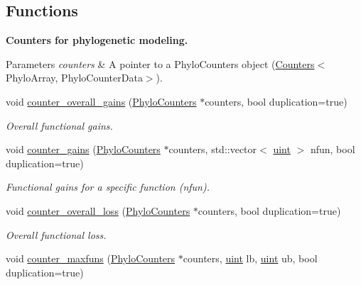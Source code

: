 \subsection*{Functions}
\begin{Indent}\textbf{ Counters for phylogenetic modeling.}\par
{\em 
\begin{DoxyParams}{Parameters}
{\em counters} & A pointer to a {\ttfamily Phylo\+Counters} object ({\ttfamily \hyperlink{classbarry_1_1_counters}{Counters}}$<${\ttfamily Phylo\+Array}, {\ttfamily Phylo\+Counter\+Data}$>$). \\
\hline
\end{DoxyParams}
}\begin{DoxyCompactItemize}
\item 
void \hyperlink{namespacebarry_1_1counters_1_1phylo_ae1e599324d656660ce8730b77efcbcce}{counter\+\_\+overall\+\_\+gains} (\hyperlink{namespacebarry_1_1counters_1_1phylo_a4e401ffe66d04091343dcffaf915f8c3}{Phylo\+Counters} $\ast$counters, bool duplication=true)
\begin{DoxyCompactList}\small\item\em Overall functional gains. \end{DoxyCompactList}\item 
void \hyperlink{namespacebarry_1_1counters_1_1phylo_afc1215e596c2f5a5e3b6f39273427a9a}{counter\+\_\+gains} (\hyperlink{namespacebarry_1_1counters_1_1phylo_a4e401ffe66d04091343dcffaf915f8c3}{Phylo\+Counters} $\ast$counters, std\+::vector$<$ \hyperlink{namespacebarry_a11dfc53ddb4672278319aa04f1e09a6c}{uint} $>$ nfun, bool duplication=true)
\begin{DoxyCompactList}\small\item\em Functional gains for a specific function ({\ttfamily nfun}). \end{DoxyCompactList}\item 
void \hyperlink{namespacebarry_1_1counters_1_1phylo_a79ccde09af0d3d47b1a3162a16bc4597}{counter\+\_\+overall\+\_\+loss} (\hyperlink{namespacebarry_1_1counters_1_1phylo_a4e401ffe66d04091343dcffaf915f8c3}{Phylo\+Counters} $\ast$counters, bool duplication=true)
\begin{DoxyCompactList}\small\item\em Overall functional loss. \end{DoxyCompactList}\item 
void \hyperlink{namespacebarry_1_1counters_1_1phylo_a80949b65fbe734d854742306065914bf}{counter\+\_\+maxfuns} (\hyperlink{namespacebarry_1_1counters_1_1phylo_a4e401ffe66d04091343dcffaf915f8c3}{Phylo\+Counters} $\ast$counters, \hyperlink{namespacebarry_a11dfc53ddb4672278319aa04f1e09a6c}{uint} lb, \hyperlink{namespacebarry_a11dfc53ddb4672278319aa04f1e09a6c}{uint} ub, bool duplication=true)

\end{DoxyCompactItemize}
\end{Indent}
